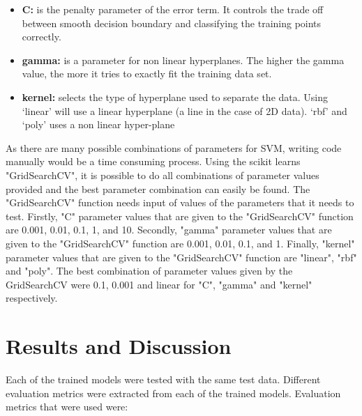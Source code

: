 \documentclass[journal]{IEEEtran}
\begin{document}
\begin{itemize}
  \item \textbf{C:} is the penalty parameter of the error term. It controls the trade off between smooth decision boundary and classifying the training points correctly.
  \item \textbf{gamma:}  is a parameter for non linear hyperplanes. The higher the gamma value, the more it tries to exactly fit the training data set.
  \item \textbf{kernel:} selects the type of hyperplane used to separate the data. Using ‘linear’ will use a linear hyperplane (a line in the case of 2D data). ‘rbf’ and ‘poly’ uses a non linear hyper-plane\\
\end{itemize}

As there are many possible combinations of parameters for SVM, writing code manually would be a time consuming process. Using the scikit learns "GridSearchCV", it is possible to do all combinations of parameter values provided and the best parameter combination can easily be found. The "GridSearchCV" function needs input of values of the parameters that it needs to test. Firstly, "C" parameter values that are given to the "GridSearchCV" function are 0.001, 0.01, 0.1, 1, and 10. Secondly, "gamma" parameter values that are given to the "GridSearchCV" function are 0.001, 0.01, 0.1, and 1. Finally, "kernel" parameter values that are given to the "GridSearchCV" function are "linear", "rbf" and "poly". The best combination of parameter values given by the GridSearchCV were 0.1, 0.001 and linear for "C", "gamma" and "kernel" respectively.

\section{Results and Discussion}

Each of the trained models were tested with the same test data. Different evaluation metrics were extracted from each of the trained models. Evaluation metrics that were used were:\\
\end{document}
